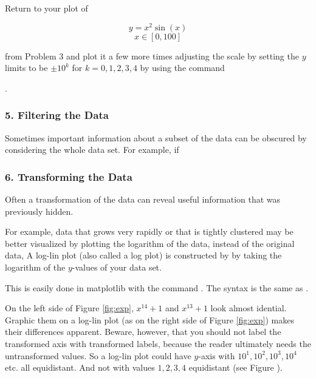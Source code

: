 \begin{problem}
Return to your plot of 

$$y = x^2\sin(x)$$ $$x\in[0,100]$$

from Problem 3 and plot it a few more times adjusting the scale by setting the $y$ limits to be $\pm10^{k}$ for $k = 0,1,2,3,4$ by using the command 

. 
\end{problem}



\subsubsection*{5. Filtering the Data}
Sometimes important information about a subset of the data can be obscured by considering the whole data set. For example, if  

\subsubsection*{6. Transforming the Data}

Often a transformation of the data can reveal useful information that was previously hidden.

For example, data that grows very rapidly or that is tightly clustered may be better visualized by plotting the logarithm of the data, instead of the original data, A log-lin plot (also called a log plot) is constructed by by taking the logarithm of the $y$-values of your data set. 

This is easily done in matplotlib with the command .  The syntax is the same as .

On the left side of Figure \ref{fig:exp}, $x^{14}+1$ and $x^{13}+1$ look almost idential. Graphic them on a log-lin plot (as on the right side of Figure \ref{fig:exp}) makes their differences apparent.  Beware, however, that you should not label the transformed axis with transformed labels, because the reader ultimately needs the untransformed values.  So a log-lin plot could have $y$-axis with $10^{1},10^{2},10^{3},10^{4}$ etc.  all equidistant.  And not with values $1,2,3,4$ equidistant (see Figure ).

